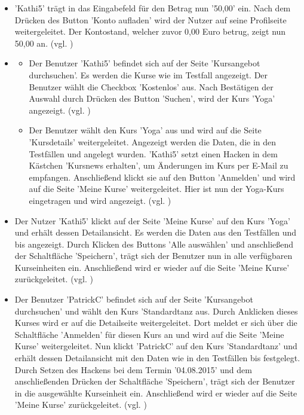 \documentclass[a4paper]{scrreprt}
\begin{document}
\begin{itemize}
\begin{itemize}
					\item 'Kathi5' trägt in das Eingabefeld für den Betrag nun '50,00' ein. Nach dem Drücken des Button 'Konto aufladen' wird der Nutzer auf seine Profilseite weitergeleitet. Der Kontostand, welcher zuvor 0,00 Euro betrug, zeigt nun 50,00 an.  (vgl. )
				\end{itemize}
			\end{itemize}
		
			\begin{itemize}
				\item {} 
					\begin{itemize}
						\item Der Benutzer 'Kathi5' befindet sich auf der Seite 'Kursangebot durchsuchen'. Es werden die Kurse wie im Testfall  angezeigt. Der Benutzer wählt die Checkbox 'Kostenlos' aus. Nach Bestätigen der Auswahl durch Drücken des Button 'Suchen', wird der Kurs 'Yoga' angezeigt. (vgl. )
						
						\item Der Benutzer wählt den Kurs 'Yoga' aus und wird auf die Seite 'Kursdetails' weitergeleitet. Angezeigt werden die Daten, die in den Testfällen  und  angelegt wurden. 'Kathi5' setzt einen Hacken in dem Kästchen 'Kursnews erhalten', um Änderungen im Kurs per E-Mail zu empfangen. Anschließend klickt sie auf den Button 'Anmelden' und wird auf die Seite 'Meine Kurse' weitergeleitet. Hier ist nun der Yoga-Kurs eingetragen und wird angezeigt. (vgl. )
					\end{itemize}
				
				\item {} 
				Der Nutzer 'Kathi5'	klickt auf der Seite 'Meine Kurse' auf den Kurs 'Yoga' und erhält dessen Detailansicht. Es werden die Daten aus den Testfällen   und  bis  angezeigt. Durch Klicken des Buttons 'Alle auswählen' und anschließend der Schaltfläche 'Speichern', trägt sich der Benutzer nun in alle verfügbaren Kurseinheiten ein. Anschließend wird er wieder auf die Seite 'Meine Kurse' zurückgeleitet. (vgl. )
				
				\item {} 
				Der Benutzer 'PatrickC' befindet sich auf der Seite 'Kursangebot durchsuchen' und wählt den Kurs 'Standardtanz aus. Durch Anklicken dieses Kurses wird er auf die Detailseite weitergeleitet. Dort meldet er sich über die Schaltfläche 'Anmelden' für diesen Kurs an und wird auf die Seite 'Meine Kurse' weitergeleitet. Nun klickt 'PatrickC' auf den Kurs 'Standardtanz' und erhält dessen Detailansicht mit den Daten wie in den Testfällen  bis  festgelegt. Durch Setzen des Hackens bei dem Termin '04.08.2015' und dem anschließenden Drücken der Schaltfläche 'Speichern', trägt sich der Benutzer in die ausgewählte Kurseinheit ein. Anschließend wird er wieder auf die Seite 'Meine Kurse' zurückgeleitet. (vgl. )
				

\end{itemize}
\end{document}
